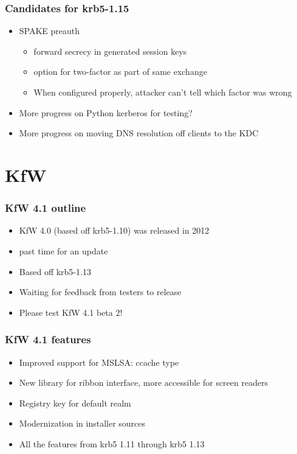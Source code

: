 \documentclass{beamer}
\begin{document}
\begin{frame}
\frametitle{Candidates for krb5-1.15}
\begin{itemize}
\item{SPAKE preauth}
	\begin{itemize}
	\item{forward secrecy in generated session keys}
	\item{option for two-factor as part of same exchange}
	\item{When configured properly, attacker can't tell which factor was
		wrong}
	\end{itemize}
\item{More progress on Python kerberos for testing?}
\item{More progress on moving DNS resolution off clients to the KDC}
\end{itemize}
\end{frame}

\section{KfW}

\begin{frame}
\frametitle{KfW 4.1 outline}
\begin{itemize}
\item{KfW 4.0 (based off krb5-1.10) was released in 2012}
\item{past time for an update}
\item{Based off krb5-1.13}
\item{Waiting for feedback from testers to release}
\item{Please test KfW 4.1 beta 2!}
\end{itemize}
\end{frame}

\begin{frame}
\frametitle{KfW 4.1 features}
\begin{itemize}
\item{Improved support for MSLSA: ccache type}
\item{New library for ribbon interface, more accessible for screen readers}
\item{Registry key for default realm}
\item{Modernization in installer sources}
\item{All the features from krb5 1.11 through krb5 1.13}
\end{itemize}
\end{frame}
\end{document}
